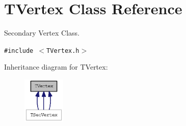 \section{TVertex Class Reference}
\label{classTVertex}
Secondary Vertex Class.  


{\tt \#include $<$TVertex.h$>$}

Inheritance diagram for TVertex:\begin{figure}[H]
\begin{center}
\leavevmode
\includegraphics[width=57pt]{classTVertex__inherit__graph}
\end{center}
\end{figure}
